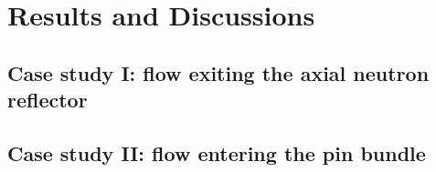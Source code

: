 \section{Results and Discussions}
\label{sec:discuss}



\subsection{Case study I: flow exiting the axial neutron reflector}
\label{sec:results1}



\subsection{Case study II: flow entering the pin bundle}
\label{sec:results2}


